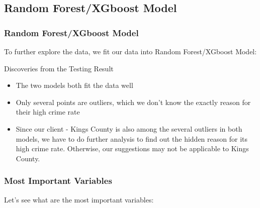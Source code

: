 \documentclass{beamer}
\begin{document}
\subsection{Random Forest/XGboost Model}
\begin{frame}[fragile]
\frametitle{Random Forest/XGboost Model}
To further explore the data, we fit our data into Random Forest/XGboost Model:
\begin{center}
\end{center}
\end{frame}


\begin{frame}{Discoveries from the Testing Result}
\begin{itemize}
\item The two models both fit the data well
\item Only several points are outliers, which we don't know the exactly reason for their high crime rate
\item Since our client - Kings County is also among the several outliers in both models, we have to do further analysis to find out the hidden reason for its high crime rate. Otherwise, our suggestions may not be applicable to Kings County.
\end{itemize}

\end{frame}

\begin{frame}[fragile]
\frametitle{Most Important Variables}
Let's see what are the most important variables:
\begin{center}
\end{center}
\end{frame}
\end{document}
